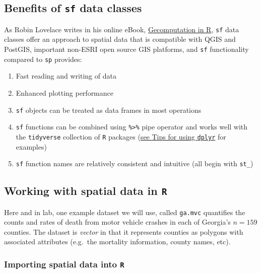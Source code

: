 \documentclass[
]{book}
\providecommand{\tightlist}{%
  \setlength{\itemsep}{0pt}\setlength{\parskip}{0pt}}
\begin{document}
\hypertarget{benefits-of-sf-data-classes}{%
\subsection{\texorpdfstring{Benefits of \texttt{sf} data classes}{Benefits of sf data classes}}\label{benefits-of-sf-data-classes}}

As Robin Lovelace writes in his online eBook, \href{https://geocompr.robinlovelace.net/}{Gecomputation in R}, \texttt{sf} data classes offer an approach to spatial data that is compatible with QGIS and PostGIS, important non-ESRI open source GIS platforms, and \texttt{sf} functionality compared to \texttt{sp} provides:

\begin{enumerate}
\def\labelenumi{\arabic{enumi}.}
\tightlist
\item
  Fast reading and writing of data
\item
  Enhanced plotting performance
\item
  \texttt{sf} objects can be treated as data frames in most operations
\item
  \texttt{sf} functions can be combined using \texttt{\%\textgreater{}\%} pipe operator and works well with the \texttt{tidyverse} collection of \texttt{R} packages (\protect\hyperlink{dplyr}{see Tips for using \texttt{dplyr}} for examples)
\item
  \texttt{sf} function names are relatively consistent and intuitive (all begin with \texttt{st\_})
\end{enumerate}

\hypertarget{working-with-spatial-data-in-r}{%
\subsection{\texorpdfstring{Working with spatial data in \texttt{R}}{Working with spatial data in R}}\label{working-with-spatial-data-in-r}}

Here and in lab, one example dataset we will use, called \texttt{ga.mvc} quantifies the counts and rates of death from motor vehicle crashes in each of Georgia's \(n=159\) counties. The dataset is \emph{vector} in that it represents counties as polygons with associated attributes (e.g.~the mortality information, county names, etc).

\hypertarget{importing-spatial-data-into-r}{%
\subsubsection{\texorpdfstring{Importing spatial data into \texttt{R}}{Importing spatial data into R}}\label{importing-spatial-data-into-r}}
\end{document}
